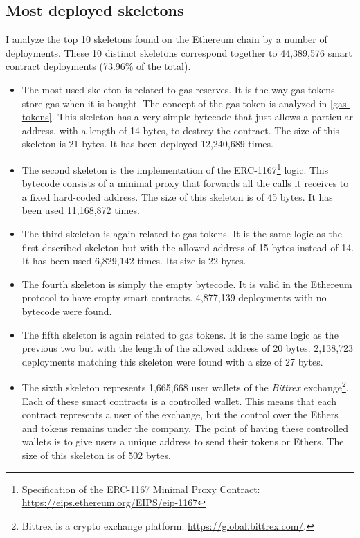 \subsection{Most deployed skeletons}
\label{most-deployed-skeletons}

I analyze the top 10 skeletons found on the Ethereum chain by a number of deployments. These 10 distinct skeletons correspond together to 44,389,576 smart contract deployments (73.96\% of the total).

\begin{itemize}

    \item The most used skeleton is related to gas reserves. It is the way gas tokens store gas when it is bought. The concept of the gas token is analyzed in \cref{gas-tokens}. This skeleton has a very simple bytecode that just allows a particular address, with a length of 14 bytes, to destroy the contract. The size of this skeleton is 21 bytes. It has been deployed 12,240,689 times.
    
    \item The second skeleton is the implementation of the ERC-1167\footnote{Specification of the ERC-1167 Minimal Proxy Contract: \url{https://eips.ethereum.org/EIPS/eip-1167}} logic. This bytecode consists of a minimal proxy that forwards all the calls it receives to a fixed hard-coded address. The size of this skeleton is of 45 bytes. It has been used 11,168,872 times.

    \item The third skeleton is again related to gas tokens. It is the same logic as the first described skeleton but with the allowed address of 15 bytes instead of 14. It has been used 6,829,142 times. Its size is 22 bytes.

    \item The fourth skeleton is simply the empty bytecode. It is valid in the Ethereum protocol to have empty smart contracts. 4,877,139 deployments with no bytecode were found.

    \item The fifth skeleton is again related to gas tokens. It is the same logic as the previous two but with the length of the allowed address of 20 bytes. 2,138,723 deployments matching this skeleton were found with a size of 27 bytes.

    \item The sixth skeleton represents 1,665,668 user wallets of the \textit{Bittrex} exchange\footnote{Bittrex is a crypto exchange platform: \url{https://global.bittrex.com/}.}. Each of these smart contracts is a controlled wallet. This means that each contract represents a user of the exchange, but the control over the Ethers and tokens remains under the company. The point of having these controlled wallets is to give users a unique address to send their tokens or Ethers. The size of this skeleton is of 502 bytes.


\end{itemize}
